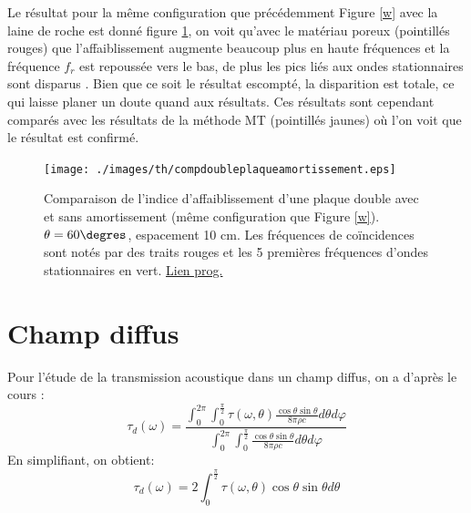 \documentclass[12pt,foolscap]{report}
\begin{document}
	Le résultat pour  la même configuration que précédemment Figure \ref{w} avec la laine de roche est donné figure \ref{double+amo}, on voit qu'avec le matériau poreux (pointillés rouges) que l'affaiblissement augmente beaucoup plus en haute fréquences et la fréquence $f_r$ est repoussée vers le bas, de plus les pics liés aux ondes stationnaires sont disparus  . Bien que ce soit le résultat escompté, la disparition est totale, ce qui laisse planer un doute quand aux résultats. Ces résultats sont cependant comparés avec les résultats de la méthode MT (pointillés jaunes) où l'on voit que le résultat est confirmé.
	
	\begin{figure}[h!]
		\centering
		\texttt{[image: ./images/th/compdoubleplaqueamortissement.eps]}
		\caption{Comparaison de l'indice d'affaiblissement d'une plaque double avec et sans amortissement (même configuration que Figure \ref{w}). $\theta = 60\degres$, espacement 10 cm. Les fréquences de coïncidences sont notés par des traits rouges et les 5 premières fréquences d'ondes stationnaires en vert. \href{https://github.com/Nuopel/Encoffrement/blob/master/Programme/comparaison_cloison1_amortissement.m}{Lien prog.}}
		\label{double+amo}
	\end{figure}
	
	\section{Champ diffus}
	
	Pour l'étude de la transmission acoustique dans un champ diffus, on a d'après le cours \cite{cours}:
	\begin{equation}
	{\tau _d}(\omega ) = \frac{{\int_0^{2\pi } {\int_0^{\frac{\pi }{2}} {\tau (\omega ,\theta )\frac{{\cos \theta \sin \theta }}{{8\pi \rho c}}d\theta d\varphi } } }}{{\int_0^{2\pi } {\int_0^{\frac{\pi }{2}} {\frac{{\cos \theta \sin \theta }}{{8\pi \rho c}}d\theta d\varphi } } }}
	\end{equation}
	En simplifiant, on obtient:
	\begin{equation}
	{\tau _d}(\omega ) = 2\int_0^{\frac{\pi }{2}} {\tau (\omega ,\theta )\cos \theta \sin \theta d\theta }
	\end{equation}
	
\end{document}
